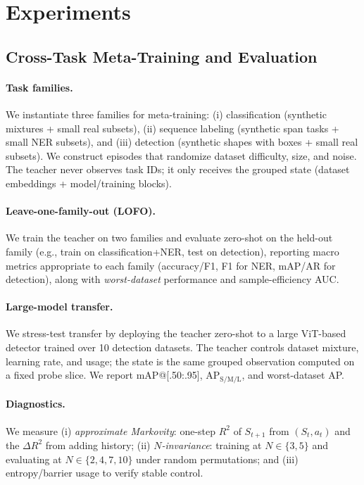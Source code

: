 \documentclass[11pt]{article}
\newcommand{\1}{\mathbf{1}}
\begin{document}
\section{Experiments}
\subsection{Cross-Task Meta-Training and Evaluation}
\paragraph{Task families.}
We instantiate three families for meta-training: (i) classification (synthetic mixtures + small real subsets), (ii) sequence labeling (synthetic span tasks + small NER subsets), and (iii) detection (synthetic shapes with boxes + small real subsets). 
We construct episodes that randomize dataset difficulty, size, and noise. 
The teacher never observes task IDs; it only receives the grouped state (dataset embeddings + model/training blocks).

\paragraph{Leave-one-family-out (LOFO).}
We train the teacher on two families and evaluate zero-shot on the held-out family (e.g., train on classification+NER, test on detection), reporting macro metrics appropriate to each family (accuracy/F1, F1 for NER, mAP/AR for detection), along with \emph{worst-dataset} performance and sample-efficiency AUC.

\paragraph{Large-model transfer.}
We stress-test transfer by deploying the teacher zero-shot to a large ViT-based detector trained over 10 detection datasets. 
The teacher controls dataset mixture, learning rate, and usage; the state is the same grouped observation computed on a fixed probe slice.
We report mAP@[.50:.95], AP$_\mathrm{S/M/L}$, and worst-dataset AP.

\paragraph{Diagnostics.}
We measure (i) \emph{approximate Markovity}: one-step $R^2$ of $S_{t+1}$ from $(S_t,a_t)$ and the $\Delta R^2$ from adding history; (ii) \emph{$N$-invariance}: training at $N\in\{3,5\}$ and evaluating at $N\in\{2,4,7,10\}$ under random permutations; and (iii) entropy/barrier usage to verify stable control.
\end{document}
